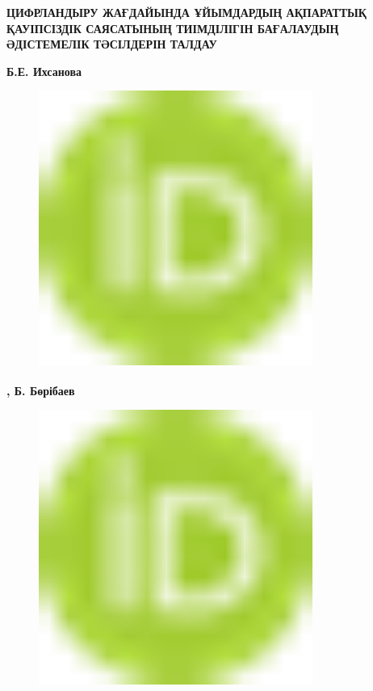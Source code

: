 
{\bfseries ЦИФРЛАНДЫРУ ЖАҒДАЙЫНДА ҰЙЫМДАРДЫҢ АҚПАРАТТЫҚ ҚАУІПСІЗДІК
САЯСАТЫНЫҢ ТИІМДІЛІГІН БАҒАЛАУДЫҢ ӘДІСТЕМЕЛІК ТӘСІЛДЕРІН ТАЛДАУ}

{\bfseries Б.Е.
Ихсанова}
\begin{figure}[H]
	\centering
	\includegraphics[width=0.8\textwidth]{media/ict/image16}
	\caption*{}
\end{figure}
{\bfseries \textsuperscript{\envelope },
Б.
Бөрібаев}
\begin{figure}[H]
	\centering
	\includegraphics[width=0.8\textwidth]{media/ict/image16}
	\caption*{}
\end{figure}

